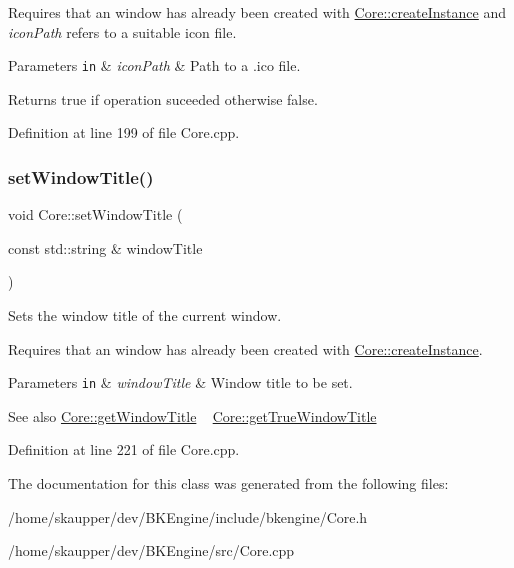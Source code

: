 Requires that an window has already been created with \hyperlink{classbkengine_1_1Core_a8b809ebbd1348ae9b59d49388e7a18f0}{Core\+::create\+Instance} and {\itshape icon\+Path} refers to a suitable icon file.


\begin{DoxyParams}[1]{Parameters}
\mbox{\tt in}  & {\em icon\+Path} & Path to a .ico file. \\
\hline
\end{DoxyParams}
\begin{DoxyReturn}{Returns}
{\ttfamily true} if operation suceeded otherwise {\ttfamily false}. 
\end{DoxyReturn}


Definition at line 199 of file Core.\+cpp.

\mbox{\label{classbkengine_1_1Core_a6c510c45e9463399359664965918b431}} 
\subsubsection{\texorpdfstring{set\+Window\+Title()}{setWindowTitle()}}
{\footnotesize\ttfamily void Core\+::set\+Window\+Title (\begin{DoxyParamCaption}\item[{const std\+::string \&}]{window\+Title }\end{DoxyParamCaption})}



Sets the window title of the current window. 

Requires that an window has already been created with \hyperlink{classbkengine_1_1Core_a8b809ebbd1348ae9b59d49388e7a18f0}{Core\+::create\+Instance}.


\begin{DoxyParams}[1]{Parameters}
\mbox{\tt in}  & {\em window\+Title} & Window title to be set.\\
\hline
\end{DoxyParams}
\begin{DoxySeeAlso}{See also}
\hyperlink{classbkengine_1_1Core_a0c42cf916f6232e384ea6d7f326becd9}{Core\+::get\+Window\+Title} ~\newline
 \hyperlink{classbkengine_1_1Core_a9fa654f1b1391876dbf77349f979e106}{Core\+::get\+True\+Window\+Title} 
\end{DoxySeeAlso}


Definition at line 221 of file Core.\+cpp.



The documentation for this class was generated from the following files\+:\begin{DoxyCompactItemize}
\item 
/home/skaupper/dev/\+B\+K\+Engine/include/bkengine/Core.\+h\item 
/home/skaupper/dev/\+B\+K\+Engine/src/Core.\+cpp\end{DoxyCompactItemize}
